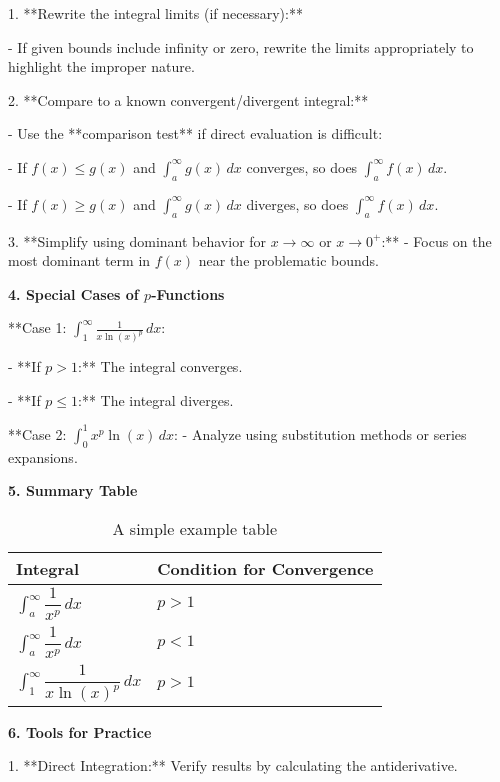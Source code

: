 \documentclass[a4paper,12pt]{book}
\begin{document}
1. **Rewrite the integral limits (if necessary):**

   - If given bounds include infinity or zero, rewrite the limits appropriately to highlight the improper nature.
   
2. **Compare to a known convergent/divergent integral:**

   - Use the **comparison test** if direct evaluation is difficult:
     
     - If \( f(x) \leq g(x) \) and \( \int_a^{\infty} g(x) \, dx \) converges, so does \( \int_a^{\infty} f(x) \, dx \).
     
     - If \( f(x) \geq g(x) \) and \( \int_a^{\infty} g(x) \, dx \) diverges, so does \( \int_a^{\infty} f(x) \, dx \).

3. **Simplify using dominant behavior for \( x \to \infty \) or \( x \to 0^+ \):**
   - Focus on the most dominant term in \( f(x) \) near the problematic bounds.

\textbf{4. Special Cases of \( p \)-Functions}

**Case 1: \( \int_1^{\infty} \frac{1}{x \ln(x)^p} \, dx \):

- **If \( p > 1 \):** The integral converges.

- **If \( p \leq 1 \):** The integral diverges.
  
**Case 2: \( \int_0^1 x^p \ln(x) \, dx \):
- Analyze using substitution methods or series expansions.

\textbf{5. Summary Table}

\begin{table}[h]
    \centering
    \begin{tabular}{|l|l}
    
        \hline
        Integral  & Condition for Convergence \\ \hline
        \( \int_a^{\infty} \dfrac{1}{x^p} \, dx \) & \( p > 1 \) \\ \hline
        \( \int_a^{\infty} \dfrac{1}{x^p} \, dx \) & \( p < 1 \) \\ \hline
        \( \int_1^{\infty} \dfrac{1}{x \ln(x)^p} \, dx \)  & \( p > 1 \)  \\ \hline
    \end{tabular}
    \caption{A simple example table}
    \label{tab:example_table}
\end{table}


\textbf{6. Tools for Practice}

1. **Direct Integration:** Verify results by calculating the antiderivative.
\end{document}
